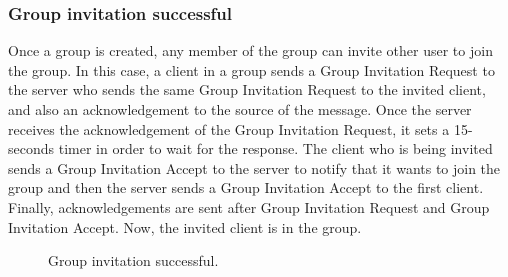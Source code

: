 \documentclass{article}
\begin{document}
\subsubsection{Group invitation successful}
Once a group is created, any member of the group can invite other user to join the group. In this case, a client in a group sends a Group Invitation Request to the server who sends the same Group Invitation Request to the invited client, and also an acknowledgement to the source of the message. Once the server receives the acknowledgement of the Group Invitation Request, it sets a 15-seconds timer in order to wait for the response. The client who is being invited sends a Group Invitation Accept to the server to notify that it wants to join the group and then the server sends a Group Invitation Accept to the first client. Finally, acknowledgements are sent after Group Invitation Request and Group Invitation Accept. Now, the invited client is in the group.
\begin{figure}[H]
    \centering
    \begin{sequencediagram}

    \end{sequencediagram}
    \caption{Group invitation successful.}
\end{figure}
\end{document}
